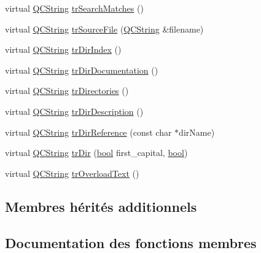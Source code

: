 \begin{DoxyCompactItemize}
virtual \hyperlink{class_q_c_string}{Q\+C\+String} \hyperlink{class_translator_hungarian_a9723f96a4768f64d6d15011a00df5832}{tr\+Search\+Matches} ()
\item 
virtual \hyperlink{class_q_c_string}{Q\+C\+String} \hyperlink{class_translator_hungarian_a4ac0c0115d6fff54cb5c66bb0147c598}{tr\+Source\+File} (\hyperlink{class_q_c_string}{Q\+C\+String} \&filename)
\item 
virtual \hyperlink{class_q_c_string}{Q\+C\+String} \hyperlink{class_translator_hungarian_a9e8005c68c3da52b1063963e04ac0a51}{tr\+Dir\+Index} ()
\item 
virtual \hyperlink{class_q_c_string}{Q\+C\+String} \hyperlink{class_translator_hungarian_a625ababc758191f63da47ea9dbef3315}{tr\+Dir\+Documentation} ()
\item 
virtual \hyperlink{class_q_c_string}{Q\+C\+String} \hyperlink{class_translator_hungarian_ac19a7d4a46a93f69c01e9b207e3a4e9f}{tr\+Directories} ()
\item 
virtual \hyperlink{class_q_c_string}{Q\+C\+String} \hyperlink{class_translator_hungarian_a08342b2709d835860ee7b616621223fc}{tr\+Dir\+Description} ()
\item 
virtual \hyperlink{class_q_c_string}{Q\+C\+String} \hyperlink{class_translator_hungarian_ae228ae74c0bab192878d1dc4354bfbbe}{tr\+Dir\+Reference} (const char $\ast$dir\+Name)
\item 
virtual \hyperlink{class_q_c_string}{Q\+C\+String} \hyperlink{class_translator_hungarian_a269aaa56f3754bbc599b865351383b47}{tr\+Dir} (\hyperlink{qglobal_8h_a1062901a7428fdd9c7f180f5e01ea056}{bool} first\+\_\+capital, \hyperlink{qglobal_8h_a1062901a7428fdd9c7f180f5e01ea056}{bool})
\item 
virtual \hyperlink{class_q_c_string}{Q\+C\+String} \hyperlink{class_translator_hungarian_ae753aff4068b68d25b1df5bb96059a44}{tr\+Overload\+Text} ()
\end{DoxyCompactItemize}
\subsection*{Membres hérités additionnels}


\subsection{Documentation des fonctions membres}
\hypertarget{class_translator_hungarian_aa36313a735b7c2bda090943922a486ba}{}

